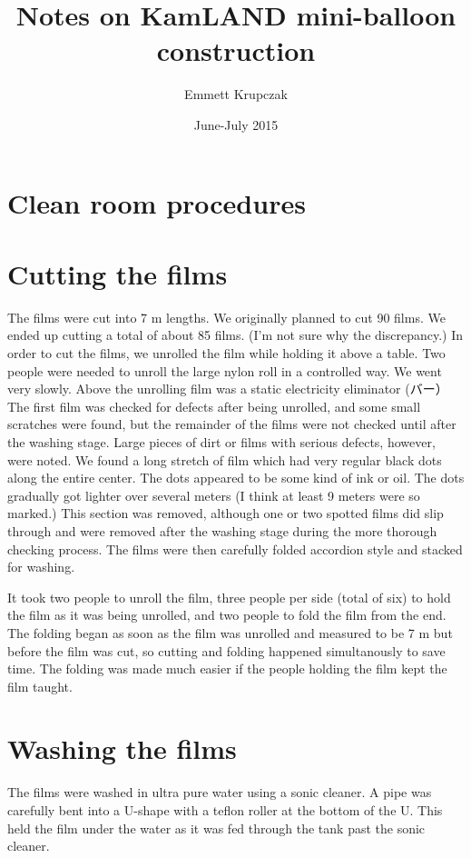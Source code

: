 \documentclass{article}
\title{Notes on KamLAND mini-balloon construction}
\date{June-July 2015}
\author{Emmett Krupczak}
\begin{document}
\maketitle



\section{Clean room procedures}

\section{Cutting the films}
The films were cut into 7 m lengths. We originally planned to cut 90 films. We ended up cutting a total of about 85 films. (I'm not sure why the discrepancy.) 
%
In order to cut the films, we unrolled the film while holding it above a table. Two people were needed to unroll the large nylon roll in a controlled way. We went very slowly. Above the unrolling film was a static electricity eliminator (バー）The first film was checked for defects after being unrolled, and some small scratches were found, but the remainder of the films were not checked until after the washing stage.  Large pieces of dirt or films with serious defects, however, were noted.  We found a long stretch of film which had very regular black dots along the entire center. The dots appeared to be some kind of ink or oil. The dots gradually got lighter over several meters (I think at least 9 meters were so marked.) This section was removed, although one or two spotted films did slip through and were removed after the washing stage during the more thorough checking process. 
The films were then carefully folded accordion style and stacked for washing.

It took two people to unroll the film, three people per side (total of six) to hold the film as it was being unrolled, and two people to fold the film from the end. The folding began as soon as the film was unrolled and measured to be 7 m but before the film was cut, so cutting and folding happened simultanously to save time. The folding was made much easier if the people holding the film kept the film taught. 

\section{Washing the films}
The films were washed in ultra pure water using a sonic cleaner. A pipe was carefully bent into a U-shape with a teflon roller at the bottom of the U. This held the film under the water as it was fed through the tank past the sonic cleaner. 
\end{document}

